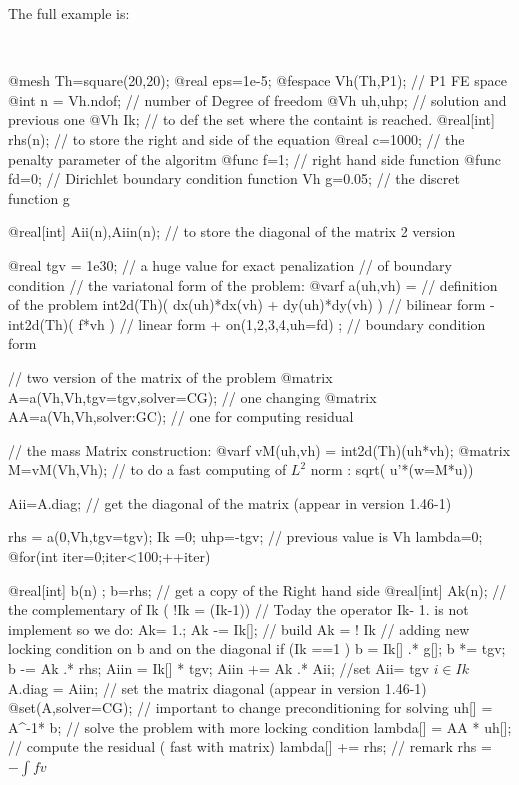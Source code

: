 \documentclass[a4paper,twoside,12pt]{book}
\begin{document}
The full example is:
\begin{example}[VI.edp]{}{}~

\bFF
@mesh Th=square(20,20);
@real eps=1e-5;
@fespace Vh(Th,P1);     // P1 FE space
@int n = Vh.ndof; // number of Degree of freedom
@Vh uh,uhp;              // solution and previous one
@Vh Ik; //  to def the set where the containt is reached.
@real[int] rhs(n); // to store the right and side of the equation
@real c=1000;  // the penalty  parameter of the algoritm
@func f=1;         //  right hand side function
@func fd=0;         // Dirichlet   boundary condition function
Vh g=0.05;  // the discret function g

@real[int] Aii(n),Aiin(n); // to store the diagonal of the matrix 2 version

@real tgv = 1e30; // a huge value for exact penalization
// of boundary condition
//  the variatonal form of the problem: \hfilll
@varf a(uh,vh) =                    //  definition of  the problem
    int2d(Th)( dx(uh)*dx(vh) + dy(uh)*dy(vh) ) //  bilinear form
  - int2d(Th)( f*vh )                          //  linear form
  + on(1,2,3,4,uh=fd) ;                      //  boundary condition form


// two version of the matrix of the problem  \hfilll
@matrix A=a(Vh,Vh,tgv=tgv,solver=CG); // one changing
@matrix AA=a(Vh,Vh,solver:GC); // one for computing residual

 //  the mass Matrix construction: \hfilll
@varf vM(uh,vh) = int2d(Th)(uh*vh);
@matrix M=vM(Vh,Vh); // to do a fast computing of $L^2$ norm : sqrt( u'*(w=M*u))

Aii=A.diag; // get the diagonal of the matrix (appear in version 1.46-1)

rhs = a(0,Vh,tgv=tgv);
Ik =0;
uhp=-tgv; // previous value is
Vh lambda=0;
@for(int iter=0;iter<100;++iter)
{
  @real[int] b(n) ; b=rhs;  //  get a copy of the Right hand side
  @real[int] Ak(n); //  the complementary of Ik ( !Ik = (Ik-1))
  // Today  the operator Ik- 1. is not implement so we do:
  Ak= 1.; Ak  -= Ik[];  // build Ak  = ! Ik
  //  adding new locking  condition on b and on the diagonal if (Ik ==1 )
  b = Ik[] .* g[];      b *= tgv;     b  -=  Ak .* rhs;
  Aiin = Ik[] *  tgv;      Aiin  +=  Ak  .* Aii;  //set  Aii= tgv  $ i \in Ik $
  A.diag = Aiin; //  set the matrix diagonal  (appear in version 1.46-1)
  @set(A,solver=CG); // important to change preconditioning  for solving
  uh[] = A^-1* b;   //  solve the problem with more locking condition
  lambda[] = AA * uh[]; //  compute the residual ( fast with matrix)
  lambda[] += rhs; // remark rhs = $-\int f v $

}
\end{example}
\end{document}
